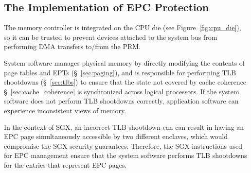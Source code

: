 \subsection {The Implementation of EPC Protection}

The memory controller is
integrated on the CPU die (see Figure~\ref{fig:cpu_die}), so it can be trusted
to prevent devices attached to the system bus from performing DMA transfers
to/from the PRM.

System software manages physical memory by directly modifying the contents of
page tables and EPTs (\S~\ref{sec:paging}), and is responsible for performing
TLB shootdowns (\S~\ref{sec:tlbs}) to ensure that the state not covered by
cache coherence \S~\ref{sec:cache_coherence} is synchronized across logical
processors. If the system software does not perform TLB shootdowns correctly,
application software can experience inconsistent views of memory.

In the context of SGX, an incorrect TLB shootdown can can result in having an
EPC page simultaneously accessible by two different enclaves, which would
compromise the SGX security guarantees. Therefore, the SGX instructions used
for EPC management ensure that the system software performs TLB shootdowns for
the entries that represent EPC pages.


